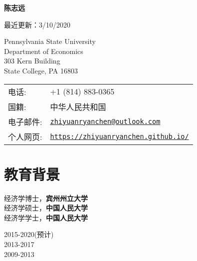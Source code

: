 \documentclass[letterpaper]{article}
\def\name{陈志远}
\begin{document}

\centerline{\huge \bf \name}

\vspace{1ex}
\begin{center}
    {\scriptsize 最近更新：3/10/2020}
\end{center}
\normalsize
\vspace{0.25in}

\begin{minipage}{0.5\linewidth}
  {Pennsylvania State University} \\
  Department of Economics \\
  303 Kern Building \\
  State College, PA 16803
\end{minipage}
\begin{minipage}{0.5\linewidth}
  \begin{tabular}{ll}
    电话: & +1 (814) 883-0365 \\
    国籍: &  中华人民共和国 \\
    电子邮件: & \href{mailto:zhiyuanryanchen@outlook.com}{\tt zhiyuanryanchen@outlook.com} \\
    个人网页: & \href{https://zhiyuanryanchen.github.io/}{\tt https://zhiyuanryanchen.github.io/} \\
  \end{tabular}
\end{minipage}





\section*{\textsc{教育背景}}

\begin{minipage}{0.5\linewidth}
  经济学博士，\textbf{宾州州立大学} \\
  经济学硕士，\textbf{中国人民大学}  \\
  经济学学士，\textbf{中国人民大学}
\end{minipage}
\begin{minipage}{0.5\linewidth}
  2015-2020(预计)\\
  2013-2017\\
  2009-2013
\end{minipage}
\end{document}
